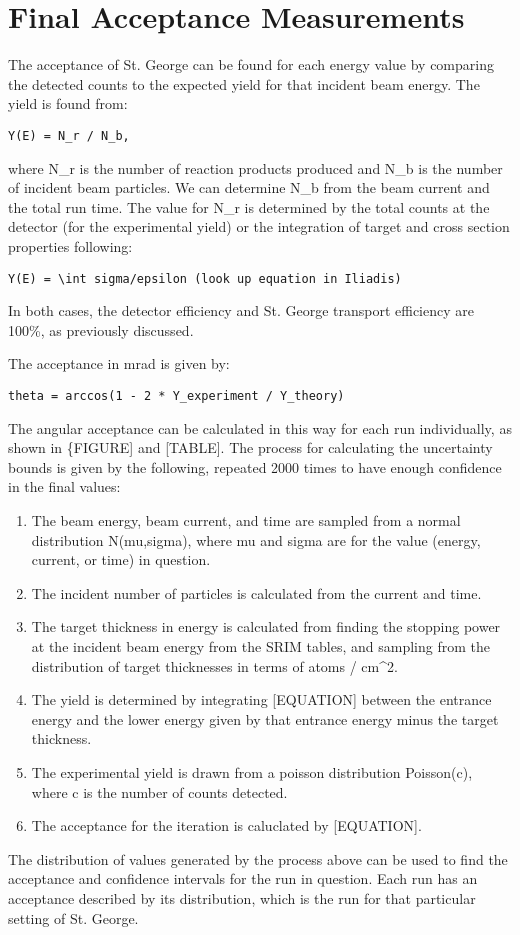 \section{Final Acceptance
Measurements}\label{final-acceptance-measurements}

The acceptance of St. George can be found for each energy value by
comparing the detected counts to the expected yield for that incident
beam energy. The yield is found from:

\begin{verbatim}
Y(E) = N_r / N_b,
\end{verbatim}

where N\_r is the number of reaction products produced and N\_b is the
number of incident beam particles. We can determine N\_b from the beam
current and the total run time. The value for N\_r is determined by the
total counts at the detector (for the experimental yield) or the
integration of target and cross section properties following:

\begin{verbatim}
Y(E) = \int sigma/epsilon (look up equation in Iliadis)
\end{verbatim}

In both cases, the detector efficiency and St. George transport
efficiency are 100\%, as previously discussed.

The acceptance in mrad is given by:

\begin{verbatim}
theta = arccos(1 - 2 * Y_experiment / Y_theory)
\end{verbatim}

The angular acceptance can be calculated in this way for each run
individually, as shown in \{FIGURE{]} and {[}TABLE{]}. The process for
calculating the uncertainty bounds is given by the following, repeated
2000 times to have enough confidence in the final values:

\begin{enumerate}
\tightlist
\item
  The beam energy, beam current, and time are sampled from a normal
  distribution N(mu,sigma), where mu and sigma are for the value
  (energy, current, or time) in question.
\item
  The incident number of particles is calculated from the current and
  time.
\item
  The target thickness in energy is calculated from finding the stopping
  power at the incident beam energy from the SRIM tables, and sampling
  from the distribution of target thicknesses in terms of atoms /
  cm\^{}2.
\item
  The yield is determined by integrating {[}EQUATION{]} between the
  entrance energy and the lower energy given by that entrance energy
  minus the target thickness.
\item
  The experimental yield is drawn from a poisson distribution
  Poisson(c), where c is the number of counts detected.
\item
  The acceptance for the iteration is caluclated by {[}EQUATION{]}.
\end{enumerate}

The distribution of values generated by the process above can be used to
find the acceptance and confidence intervals for the run in question.
Each run has an acceptance described by its distribution, which is the
run for that particular setting of St. George.
